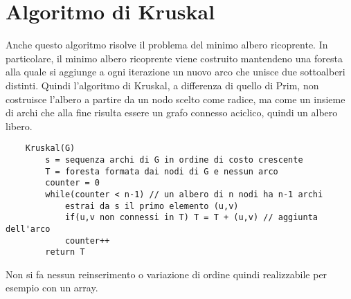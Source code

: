 \documentclass[12pt]{article}
\begin{document}
\section{Algoritmo di Kruskal}
Anche questo algoritmo risolve il problema del minimo albero ricoprente. In particolare, il minimo albero ricoprente viene costruito mantendeno una foresta alla quale si aggiunge a ogni iterazione un nuovo arco che unisce due sottoalberi distinti. Quindi l'algoritmo di Kruskal, a differenza di quello di Prim, non costruisce l'albero a partire da un nodo scelto come radice, ma come un insieme di archi che alla fine risulta essere un grafo connesso aciclico, quindi un albero libero.
\begin{verbatim}
    Kruskal(G)
        s = sequenza archi di G in ordine di costo crescente
        T = foresta formata dai nodi di G e nessun arco
        counter = 0
        while(counter < n-1) // un albero di n nodi ha n-1 archi
            estrai da s il primo elemento (u,v)
            if(u,v non connessi in T) T = T + (u,v) // aggiunta dell'arco
            counter++
        return T
\end{verbatim}
Non si fa nessun reinserimento o variazione di ordine quindi realizzabile per esempio con un array.
\end{document}
